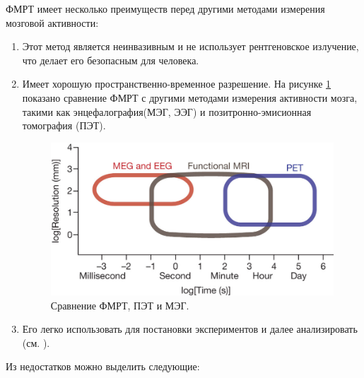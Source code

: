 \documentclass[pdftex,ptm,12pt,a4paper]{report}
\theoremstyle{definition}
\begin{document}
ФМРТ имеет несколько преимуществ перед другими методами измерения мозговой активности:
\begin{enumerate}
\item Этот метод является неинвазивным и не использует рентгеновское излучение, что делает его безопасным для человека.

\item Имеет хорошую пространственно-временное разрешение. На рисунке \ref{fmri} показано сравнение ФМРТ с другими методами измерения активности мозга, такими как энцефалография(МЭГ, ЭЭГ) и позитронно-эмисионная томография (ПЭТ).

\begin{figure}[h]
\includegraphics[scale=0.3]{images/fmrt.jpg}
\centering
\caption{Сравнение ФМРТ, ПЭТ и МЭГ.}
\label{fmri}
\end{figure}

\item Его легко использовать для постановки экспериментов и далее анализировать (см. \cite{abraham2014machine}).
\end{enumerate}

Из недостатков можно выделить следующие:
\end{document}
